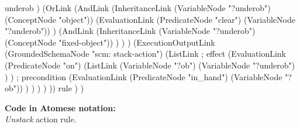 \begin{python}
              underob
            )
            (OrLink
              (AndLink
                (InheritanceLink
                  (VariableNode "?underob")
                  (ConceptNode "object"))
                (EvaluationLink
                  (PredicateNode "clear")
                  (VariableNode "?underob"))
              )
              (AndLink
                (InheritanceLink
                  (VariableNode "?underob")
                  (ConceptNode "fixed-object"))
              )
            )
          )
          (ExecutionOutputLink
            (GroundedSchemaNode "scm: stack-action")
            (ListLink
              ; effect
              (EvaluationLink
                (PredicateNode "on")
                (ListLink
                  (VariableNode "?ob")
                  (VariableNode "?underob")
                )
              )
              ; precondition
              (EvaluationLink
                (PredicateNode "in_hand")
                (VariableNode "?ob"))
             )
          )
        )
      )
    ))
    rule
  )
)
\end{python}

\bigskip

\begin{footnotesize}
\textbf{Code in Atomese notation:} \\
\textit{Unstack} action rule.
\end{footnotesize}

